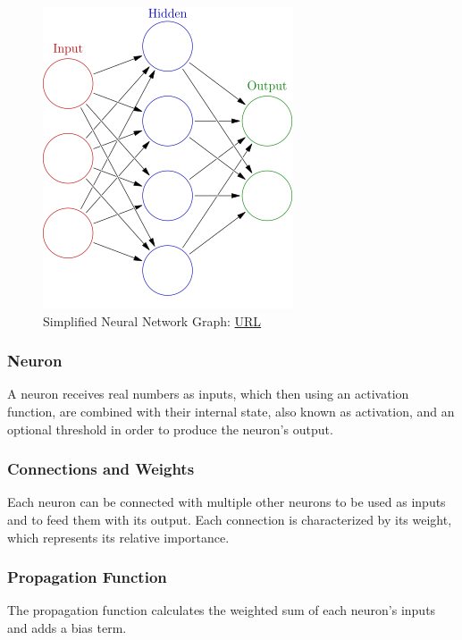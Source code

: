 \begin{figure} [ht]
	\centering
	\includegraphics[scale=0.6]{Images/simplified-neural-network-graph.png}
	\decoRule
	\caption[Simplified Neural Network Graph]{Simplified Neural Network Graph: \href{https://en.wikipedia.org/wiki/Artificial_neural_network}{URL}}
	\label{fig:simplified-neural-network-graph}
\end{figure}

\subsubsection{Neuron}
A neuron receives real numbers as inputs, which then using an activation function, are combined with their internal state, also known as activation, and an optional threshold in order to produce the neuron's output.

\subsubsection{Connections and Weights}
Each neuron can be connected with multiple other neurons to be used as inputs and to feed them with its output. Each connection is characterized by its weight, which represents its relative importance.

\subsubsection{Propagation Function}
The propagation function calculates the weighted sum of each neuron's inputs and adds a bias term.

